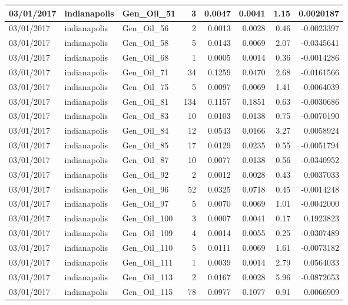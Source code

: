 \documentclass[
  letterpaper,
  DIV=11,
  numbers=noendperiod]{scrartcl}
\begin{document}
\begin{tabular}{l|l|l|r|r|r|r|r}
\hline
03/01/2017 & indianapolis & Gen\_Oil\_51 & 3 & 0.0047 & 0.0041 & 1.15 & 0.0020187\\
\hline
03/01/2017 & indianapolis & Gen\_Oil\_56 & 2 & 0.0013 & 0.0028 & 0.46 & -0.0023397\\
\hline
03/01/2017 & indianapolis & Gen\_Oil\_58 & 5 & 0.0143 & 0.0069 & 2.07 & -0.0345641\\
\hline
03/01/2017 & indianapolis & Gen\_Oil\_68 & 1 & 0.0005 & 0.0014 & 0.36 & -0.0014286\\
\hline
03/01/2017 & indianapolis & Gen\_Oil\_71 & 34 & 0.1259 & 0.0470 & 2.68 & -0.0161566\\
\hline
03/01/2017 & indianapolis & Gen\_Oil\_75 & 5 & 0.0097 & 0.0069 & 1.41 & -0.0064039\\
\hline
03/01/2017 & indianapolis & Gen\_Oil\_81 & 134 & 0.1157 & 0.1851 & 0.63 & -0.0030686\\
\hline
03/01/2017 & indianapolis & Gen\_Oil\_83 & 10 & 0.0103 & 0.0138 & 0.75 & -0.0070190\\
\hline
03/01/2017 & indianapolis & Gen\_Oil\_84 & 12 & 0.0543 & 0.0166 & 3.27 & 0.0058924\\
\hline
03/01/2017 & indianapolis & Gen\_Oil\_85 & 17 & 0.0129 & 0.0235 & 0.55 & -0.0051794\\
\hline
03/01/2017 & indianapolis & Gen\_Oil\_87 & 10 & 0.0077 & 0.0138 & 0.56 & -0.0340952\\
\hline
03/01/2017 & indianapolis & Gen\_Oil\_92 & 2 & 0.0012 & 0.0028 & 0.43 & 0.0037033\\
\hline
03/01/2017 & indianapolis & Gen\_Oil\_96 & 52 & 0.0325 & 0.0718 & 0.45 & -0.0014248\\
\hline
03/01/2017 & indianapolis & Gen\_Oil\_97 & 5 & 0.0070 & 0.0069 & 1.01 & -0.0042000\\
\hline
03/01/2017 & indianapolis & Gen\_Oil\_100 & 3 & 0.0007 & 0.0041 & 0.17 & 0.1923823\\
\hline
03/01/2017 & indianapolis & Gen\_Oil\_109 & 4 & 0.0014 & 0.0055 & 0.25 & -0.0307489\\
\hline
03/01/2017 & indianapolis & Gen\_Oil\_110 & 5 & 0.0111 & 0.0069 & 1.61 & -0.0073182\\
\hline
03/01/2017 & indianapolis & Gen\_Oil\_111 & 1 & 0.0039 & 0.0014 & 2.79 & 0.0564033\\
\hline
03/01/2017 & indianapolis & Gen\_Oil\_113 & 2 & 0.0167 & 0.0028 & 5.96 & -0.0872653\\
\hline
03/01/2017 & indianapolis & Gen\_Oil\_115 & 78 & 0.0977 & 0.1077 & 0.91 & 0.0066909\\

\end{tabular}
\end{document}
